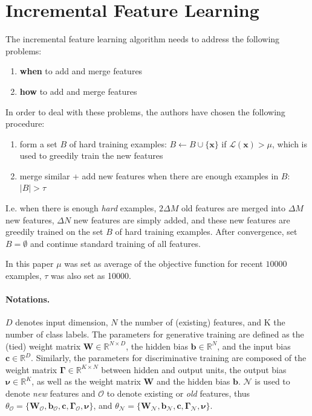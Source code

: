 \documentclass[a4paper,twocolumn]{article}
\newcommand{\N}{\mathcal{N}}
\renewcommand{\L}{\mathcal{L}}
\renewcommand{\O}{\mathcal{O}}
\let\originalnu\nu
\renewcommand{\nu}{\boldsymbol{\originalnu}}
\begin{document}
\section{Incremental Feature Learning}
The incremental feature learning algorithm needs to address the following problems:
\begin{enumerate}
    \item \textbf{when} to add and merge features
    \item \textbf{how} to add and merge features
\end{enumerate}
In order to deal with these problems, the authors have chosen the following procedure:
\begin{enumerate}
    \item form a set $B$ of hard training examples: $B \leftarrow B \cup \{\textbf{x}\}$ if $\L(\textbf{x}) > \mu$, which is used to greedily train the new features
    \item merge similar + add new features when there are enough examples in $B$: $|B| > \tau$
\end{enumerate}
I.e. when there is enough \textit{hard} examples, $2\Delta M$ old features are merged into $\Delta M$ new features, $\Delta N$ new features are simply added, and these new features are greedily trained on the set $B$ of hard training examples. After convergence, set $B = \emptyset$ and continue standard training of all features.

In this paper $\mu$ was set as average of the objective function for recent $10000$ examples, $\tau$ was also set as 10000.

\paragraph{Notations.} $D$ denotes input dimension, $N$ the number of (existing) features, and K the number of class labels. The parameters for generative training are defined as the (tied) weight matrix $\mathbf{W} \in \mathbb{R}^{N \times D}$, the hidden bias $\mathbf{b} \in \mathbb{R}^N$, and the input bias $\mathbf{c} \in \mathbb{R}^D$. Similarly, the parameters for discriminative training are composed of the weight matrix $\mathbf{\Gamma} \in \mathbb{R}^{K \times N}$ between hidden and output units, the output bias $\nu \in \mathbb{R}^K$, as well as the weight matrix $\mathbf{W}$ and the hidden bias $\mathbf{b}$. $\N$ is used to denote \textit{new} features and $\O$ to denote existing or \textit{old} features, thus $\theta_\O = \{\mathbf{W_\O, b_\O, c, \Gamma_\O, \nu}\}$, and $\theta_\N = \{\mathbf{W_\N, b_\N, c, \Gamma_\N, \nu}\}$.
\end{document}

